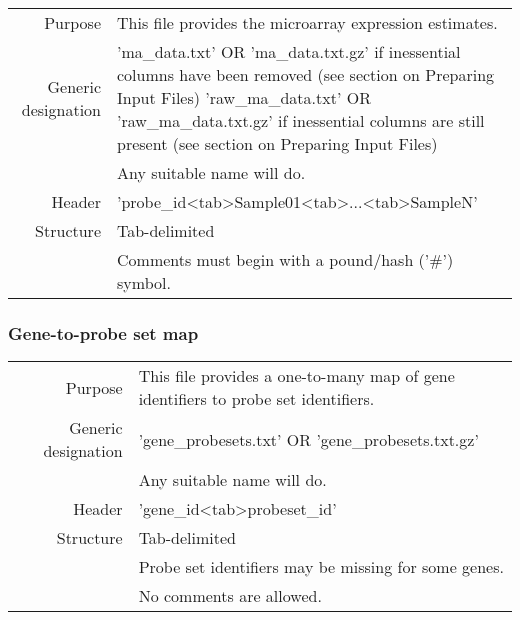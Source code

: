 \documentclass[a4paper,12pt]{article}
\begin{document}
\begin{tabular}{rp{12cm}}
Purpose & This file provides the microarray expression estimates. \\
Generic designation & 'ma\_data.txt' OR 'ma\_data.txt.gz' if inessential columns have been removed (see section on Preparing Input Files)
'raw\_ma\_data.txt' OR 'raw\_ma\_data.txt.gz' if inessential columns are still present (see section on Preparing Input Files) \\
  & Any suitable name will do. \\
Header & 'probe\_id\textless tab\textgreater Sample01\textless tab\textgreater...\textless tab\textgreater SampleN' \\
Structure & Tab-delimited \\
  & Comments must begin with a pound/hash ('\#') symbol. \\
\end{tabular}

\subsubsection{Gene-to-probe set map}

\begin{tabular}{rp{12cm}}
Purpose & This file provides a one-to-many map of gene identifiers to probe set identifiers. \\
Generic designation & 'gene\_probesets.txt' OR 'gene\_probesets.txt.gz' \\
  & Any suitable name will do. \\
Header & 'gene\_id\textless tab\textgreater probeset\_id' \\
Structure & Tab-delimited \\
  & Probe set identifiers may be missing for some genes. \\
  & No comments are allowed. \\
\end{tabular}
\end{document}
